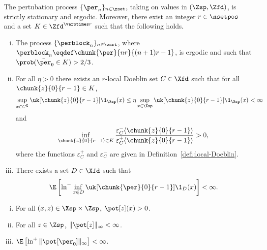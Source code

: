 \begin{hypA} \label{assum:likelihoodDrift}
The pertubation process $\{ \per_n \}_{n \in \zset}$, taking on values in $(\Zsp, \Zfd)$, is strictly stationary and ergodic. Moreover, there exist an integer $r \in \nsetpos $ and a set $K \in \Zfd^{\varotimes r}$ such that the following holds.
\begin{enumerate}[(i)]
    \item \label{item:condition-L-K}
    The process $\{\perblock_n \}_{n \in \zset}$, where $\perblock_n \eqdef \chunk{\per}{n r}{(n + 1)r - 1}$, is ergodic and such that $\prob(\bar{\per}_0 \in K) > 2/3$.
    \item For all $\eta > 0$ there exists an $r$-local Doeblin set $C \in \Xfd$ such that for all $\chunk{z}{0}{r - 1} \in K$,
    \begin{equation*}
        \label{eq:bound-eta-G}
        \sup_{x \in C^\complement} \uk[\chunk{z}{0}{r-1}] \1_\Xsp(x) \leq \eta \sup_{x \in \Xsp} \uk[\chunk{z}{0}{r - 1}] \1_\Xsp(x) < \infty
    \end{equation*}
    and
    \begin{equation*} \label{eq:lower-bound}
        \inf_{\chunk{z}{0}{r - 1} \in K} \frac{\varepsilon_C^- \langle \chunk{z}{0}{r - 1} \rangle}{\varepsilon_C^+ \langle \chunk{z}{0}{r - 1} \rangle} > 0,
    \end{equation*}
    where the functions $\varepsilon^+_C$ and $\varepsilon^-_C$ are given in Definition~\ref{defi:local-Doeblin}.
    \item \label{item:condition-minoration}
    There exists a set $D \in \Xfd$ such that
    \begin{equation*}
        \label{eq:condition-minoration}
        \E \left[\ln^- \inf_{x \in D} \uk[\chunk{\per}{0}{r-1}] \1_D(x) \right] < \infty.
    \end{equation*}
\end{enumerate}
\end{hypA}

\begin{hypA}\label{assum:majo-g}
\begin{enumerate}[(i)]
    \item \label{item:assum-pos-g} For all $(x, z) \in \Xsp \times \Zsp$, $\pot[z](x) > 0$.
    \item \label{item:bdd:g} For all $z \in \Zsp$, $\| \pot[z] \|_\infty < \infty$.
    \item \label{item:assum-supg} $\E \left[ \ln^+ \| \pot[\per_0] \|_\infty \right] < \infty$.
\end{enumerate}
\end{hypA}

